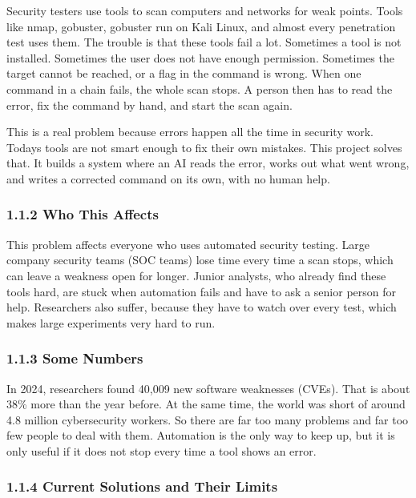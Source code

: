 \documentclass[
]{article}
\begin{document}
Security testers use tools to scan computers and networks for weak
points. Tools like nmap, gobuster, gobuster run on Kali Linux, and
almost every penetration test uses them. The trouble is that these tools
fail a lot. Sometimes a tool is not installed. Sometimes the user does
not have enough permission. Sometimes the target cannot be reached, or a
flag in the command is wrong. When one command in a chain fails, the
whole scan stops. A person then has to read the error, fix the command
by hand, and start the scan again.

This is a real problem because errors happen all the time in security
work. Today\textquotesingle s tools are not smart enough to fix their
own mistakes. This project solves that. It builds a system where an AI
reads the error, works out what went wrong, and writes a corrected
command on its own, with no human help.

\hypertarget{who-this-affects}{%
\subsubsection{1.1.2 Who This Affects}\label{who-this-affects}}

This problem affects everyone who uses automated security testing. Large
company security teams (SOC teams) lose time every time a scan stops,
which can leave a weakness open for longer. Junior analysts, who already
find these tools hard, are stuck when automation fails and have to ask a
senior person for help. Researchers also suffer, because they have to
watch over every test, which makes large experiments very hard to run.

\hypertarget{some-numbers}{%
\subsubsection{1.1.3 Some Numbers}\label{some-numbers}}

In 2024, researchers found 40,009 new software weaknesses (CVEs). That
is about 38\% more than the year before. At the same time, the world was
short of around 4.8 million cybersecurity workers. So there are far too
many problems and far too few people to deal with them. Automation is
the only way to keep up, but it is only useful if it does not stop every
time a tool shows an error.

\hypertarget{current-solutions-and-their-limits}{%
\subsubsection{1.1.4 Current Solutions and Their
Limits}\label{current-solutions-and-their-limits}}
\end{document}
